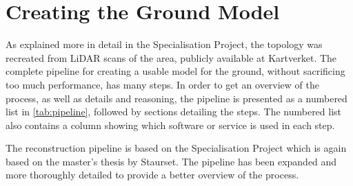 \section{Creating the Ground Model}
    \label{sec:recreating_ground}
    As explained more in detail in the Specialisation Project\cite{specialisation}, the topology was recreated from LiDAR scans of the area, publicly available at Kartverket\cite{hoydedata}. The complete pipeline for creating a usable model for the ground, without sacrificing too much performance, has many steps. In order to get an overview of the process, as well as details and reasoning, the pipeline is presented as a numbered list in \cref{tab:pipeline}, followed by sections detailing the steps. The numbered list also contains a column showing which software or service is used in each step.
    
   The reconstruction pipeline is based on the Specialisation Project which is again based on the master's thesis by Staurset\cite{ski_jump}. The pipeline has been expanded and more thoroughly detailed to provide a better overview of the process.
    
    \setcounter{rownumbers}{0}
    
